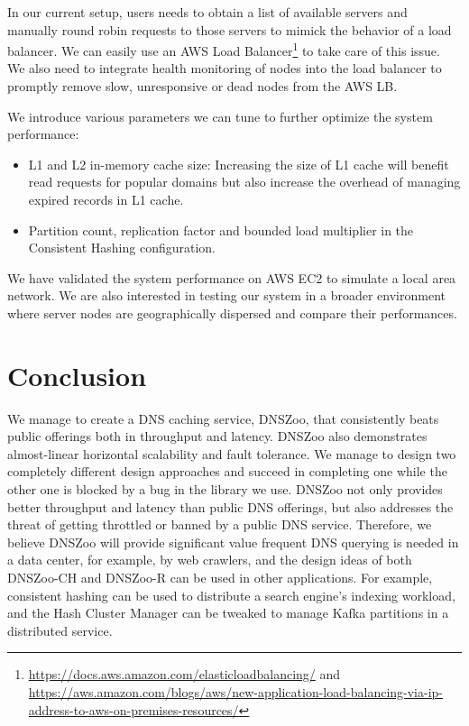 \documentclass[format=sigconf,nonacm,screen]{acmart}
\newcommand{\dnszoo}{\textsf{DNSZoo}}
\newcommand{\dnszooch}{\textsf{DNSZoo-CH}}
\newcommand{\dnszoor}{\textsf{DNSZoo-R}}
\begin{document}
In our current setup, users needs to obtain a list of available servers and manually round robin requests to those servers to mimick the behavior of a load balancer. We can easily use an AWS Load Balancer\footnote{\url{https://docs.aws.amazon.com/elasticloadbalancing/} and \url{https://aws.amazon.com/blogs/aws/new-application-load-balancing-via-ip-address-to-aws-on-premises-resources/}} to take care of this issue. We also need to integrate health monitoring of nodes into the load balancer to promptly remove slow, unresponsive or dead nodes from the AWS LB.

We introduce various parameters we can tune to further optimize the system performance:
\begin{itemize}
  \item L1 and L2 in-memory cache size: Increasing the size of L1 cache will benefit read requests for popular domains but also increase the overhead of managing expired records in L1 cache. 
  \item Partition count, replication factor and bounded load multiplier in the Consistent Hashing configuration.
\end{itemize}

We have validated the system performance on AWS EC2 to simulate a local area network. We are also interested in testing our system in a broader environment where server nodes are  geographically dispersed and compare their performances.

\section{Conclusion}
We manage to create a DNS caching service, \dnszoo{}, that consistently beats public offerings both in throughput and latency. \dnszoo{} also demonstrates almost-linear horizontal scalability and fault tolerance. We manage to design two completely different design approaches and succeed in completing one while the other one is blocked by a bug in the library we use. \dnszoo{} not only provides better throughput and latency than public DNS offerings, but also addresses the threat of getting throttled or banned by a public DNS service. Therefore, we believe \dnszoo{} will provide significant value frequent DNS querying is needed in a data center, for example, by web crawlers, and the design ideas of both \dnszooch{} and \dnszoor{} can be used in other applications. For example, consistent hashing can be used to distribute a search engine's indexing workload, and the Hash Cluster Manager can be tweaked to manage Kafka partitions in a distributed service.
\end{document}
